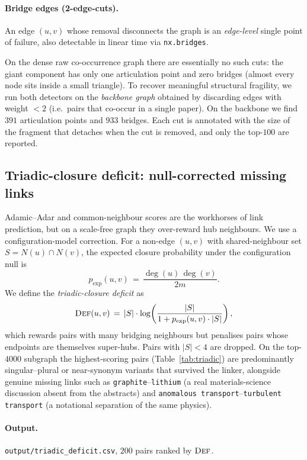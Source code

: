 \documentclass[11pt,a4paper]{article}
\newcommand{\code}[1]{\texttt{\small #1}}
\begin{document}
\paragraph{Bridge edges (2-edge-cuts).} An edge $(u,v)$ whose removal disconnects the graph is an \emph{edge-level} single point of failure, also detectable in linear time via \code{nx.bridges}.

On the dense raw co-occurrence graph there are essentially no such cuts: the giant component has only one articulation point and zero bridges (almost every node sits inside a small triangle). To recover meaningful structural fragility, we run both detectors on the \emph{backbone graph} obtained by discarding edges with weight $<2$ (i.e.\ pairs that co-occur in a single paper). On the backbone we find $391$ articulation points and $933$ bridges. Each cut is annotated with the size of the fragment that detaches when the cut is removed, and only the top-$100$ are reported.

\subsection{Triadic-closure deficit: null-corrected missing links}
\label{sec:triadic}
Adamic--Adar and common-neighbour scores are the workhorses of link prediction, but on a scale-free graph they over-reward hub neighbours. We use a configuration-model correction. For a non-edge $(u,v)$ with shared-neighbour set $S=N(u)\cap N(v)$, the expected closure probability under the configuration null is
\[
p_{\text{exp}}(u,v) \,=\, \frac{\deg(u)\,\deg(v)}{2m}.
\]
We define the \emph{triadic-closure deficit} as
\begin{equation}\label{eq:deficit}
\textsc{Def}(u,v) \,=\, |S| \cdot \log\!\left(\frac{|S|}{1 + p_{\text{exp}}(u,v)\cdot |S|}\right),
\end{equation}
which rewards pairs with many bridging neighbours but penalises pairs whose endpoints are themselves super-hubs. Pairs with $|S|<4$ are dropped. On the top-$4000$ subgraph the highest-scoring pairs (Table~\ref{tab:triadic}) are predominantly singular--plural or near-synonym variants that survived the linker, alongside genuine missing links such as \code{graphite}--\code{lithium} (a real materials-science discussion absent from the abstracts) and \code{anomalous transport}--\code{turbulent transport} (a notational separation of the same physics).

\paragraph{Output.} \code{output/triadic\_deficit.csv}, $200$ pairs ranked by $\textsc{Def}$.
\end{document}
